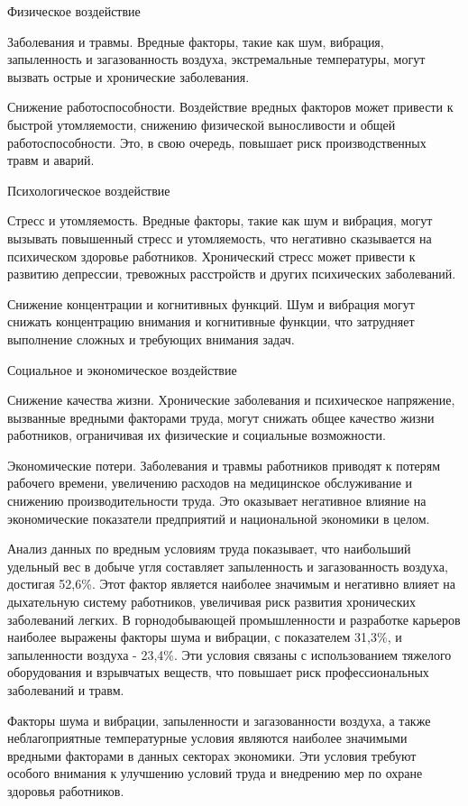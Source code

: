 \begin{multicols}{2}
Физическое воздействие

Заболевания и травмы. Вредные факторы, такие как шум, вибрация,
запыленность и загазованность воздуха, экстремальные температуры, могут
вызвать острые и хронические заболевания.

Снижение работоспособности. Воздействие вредных факторов может привести
к быстрой утомляемости, снижению физической выносливости и общей
работоспособности. Это, в свою очередь, повышает риск производственных
травм и аварий.

Психологическое воздействие

Стресс и утомляемость. Вредные факторы, такие как шум и вибрация, могут
вызывать повышенный стресс и утомляемость, что негативно сказывается на
психическом здоровье работников. Хронический стресс может привести к
развитию депрессии, тревожных расстройств и других психических
заболеваний.

Снижение концентрации и когнитивных функций. Шум и вибрация могут
снижать концентрацию внимания и когнитивные функции, что затрудняет
выполнение сложных и требующих внимания задач.

Социальное и экономическое воздействие

Снижение качества жизни. Хронические заболевания и психическое
напряжение, вызванные вредными факторами труда, могут снижать общее
качество жизни работников, ограничивая их физические и социальные
возможности.

Экономические потери. Заболевания и травмы работников приводят к потерям
рабочего времени, увеличению расходов на медицинское обслуживание и
снижению производительности труда. Это оказывает негативное влияние на
экономические показатели предприятий и национальной экономики в целом.

Анализ данных по вредным условиям труда показывает, что наибольший
удельный вес в добыче угля составляет запыленность и загазованность
воздуха, достигая 52,6\%. Этот фактор является наиболее значимым и
негативно влияет на дыхательную систему работников, увеличивая риск
развития хронических заболеваний легких. В горнодобывающей
промышленности и разработке карьеров наиболее выражены факторы шума и
вибрации, с показателем 31,3\%, и запыленности воздуха - 23,4\%. Эти
условия связаны с использованием тяжелого оборудования и взрывчатых
веществ, что повышает риск профессиональных заболеваний и травм.

Факторы шума и вибрации, запыленности и загазованности воздуха, а также
неблагоприятные температурные условия являются наиболее значимыми
вредными факторами в данных секторах экономики. Эти условия требуют
особого внимания к улучшению условий труда и внедрению мер по охране
здоровья работников.


\end{multicols}
